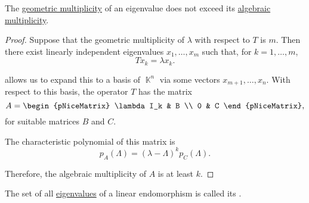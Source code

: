 \begin{proposition}\label{thm:geometric_vs_algebraic_multiplicity}
  The \hyperref[def:characteristic_polynomial]{geometric multiplicity} of an eigenvalue does not exceed its \hyperref[def:characteristic_polynomial]{algebraic multiplicity}.
\end{proposition}
\begin{proof}
  Suppose that the geometric multiplicity of \( \lambda \) with respect to \( T \) is \( m \). Then there exist linearly independent eigenvalues \( x_1, \ldots, x_m \) such that, for \( k = 1, \ldots, m \),
  \begin{equation*}
    T x_k = \lambda x_k.
  \end{equation*}

   allows us to expand this to a basis of \( \BbbK^n \) via some vectors \( x_{m+1}, \ldots, x_n \). With respect to this basis, the operator \( T \) has the matrix
  \begin{equation*}
    A = \begin{pNiceMatrix}
      \lambda I_k & B \\
      0           & C
    \end{pNiceMatrix},
  \end{equation*}
  for suitable matrices \( B \) and \( C \).

  The characteristic polynomial of this matrix is
  \begin{equation*}
    p_A(\Lambda) = (\lambda - \Lambda)^k p_C(\Lambda).
  \end{equation*}

  Therefore, the algebraic multiplicity of \( A \) is at least \( k \).
\end{proof}

\begin{definition}\label{def:point_spectrum}
  The set of all \hyperref[def:eigenpair]{eigenvalues} of a linear endomorphism is called its .
\end{definition}

